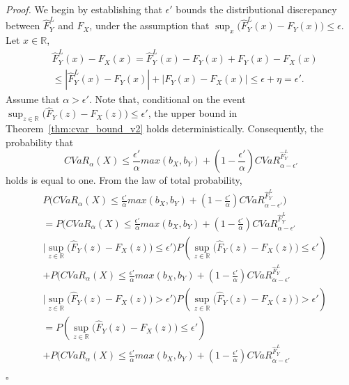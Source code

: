 \documentclass[letterpaper]{article} %
\newenvironment{proof}{\noindent\textit{Proof.}}{\hfill$\square$}
\begin{document}
\begin{proof}
	We begin by establishing that $\epsilon'$ bounds the distributional discrepancy between $\hat{F}_Y^L$ and $F_X$, under the assumption that $\sup_x \big( \hat{F}_Y^L(x) - F_Y(x) \big) \leq \epsilon$. Let $x\in \mathbb{R}$,
	\begin{equation}
		\begin{aligned}
			&\hat{F}_Y^L(x)-F_X(x)=\hat{F}_Y^L(x)-F_Y(x) + F_Y(x)-F_X(x) \\
			&\leq |\hat{F}_Y^L(x)-F_Y(x)| + |F_Y(x)-F_X(x)| \leq \epsilon + \eta=\epsilon'.
		\end{aligned}
	\end{equation}
	Assume that $\alpha > \epsilon'$. Note that, conditional on the event $\sup_{z \in \mathbb{R}} \big( \hat{F}_Y(z) - F_X(z) \big) \leq \epsilon'$,
	the upper bound in Theorem~\ref{thm:cvar_bound_v2} holds deterministically. Consequently, the probability that
	\begin{equation}
		CVaR_\alpha(X) \leq \frac{\epsilon'}{\alpha}max(b_X,b_Y) 
		+ (1 - \frac{\epsilon'}{\alpha})CVaR_{\alpha-\epsilon'}^{\hat{F}_Y^L}
	\end{equation}
	holds is equal to one. From the law of total probability, 
	\begin{equation}
		\begin{aligned}
			&P\Big(CVaR_\alpha(X) \leq \frac{\epsilon'}{\alpha}max(b_X,b_Y) + (1 - \frac{\epsilon'}{\alpha})CVaR_{\alpha-\epsilon'}^{\hat{F}_Y^L}\Big) \\
			&=P\Big(CVaR_\alpha(X) \leq \frac{\epsilon'}{\alpha}max(b_X,b_Y) + (1 - \frac{\epsilon'}{\alpha})CVaR_{\alpha-\epsilon'}^{\hat{F}_Y^L} \\
			&\Big|\sup_{z \in \mathbb{R}} \big( \hat{F}_Y(z) - F_X(z) \big) \leq \epsilon'\Big) 
			P(\sup_{z \in \mathbb{R}} \big( \hat{F}_Y(z) - F_X(z) \big) \leq \epsilon') \\
			&+P\Big(CVaR_\alpha(X) \leq \frac{\epsilon'}{\alpha}max(b_X,b_Y) + (1 - \frac{\epsilon'}{\alpha})CVaR_{\alpha-\epsilon'}^{\hat{F}_Y^L} \\
			&\Big|\sup_{z \in \mathbb{R}} \big( \hat{F}_Y(z) - F_X(z) \big) > \epsilon'\Big) 
			P(\sup_{z \in \mathbb{R}} \big( \hat{F}_Y(z) - F_X(z) \big) > \epsilon')\\
			&=P(\sup_{z \in \mathbb{R}} \big( \hat{F}_Y(z) - F_X(z) \big) \leq \epsilon') \\
			&+P\Big(CVaR_\alpha(X) \leq \frac{\epsilon'}{\alpha}max(b_X,b_Y) + (1 - \frac{\epsilon'}{\alpha})CVaR_{\alpha-\epsilon'}^{\hat{F}_Y^L} \\

\end{aligned}
\end{equation}
\end{proof}
\end{document}
